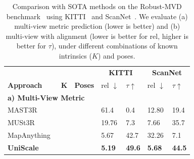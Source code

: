 \documentclass[letterpaper, 10 pt, conference]{ieeeconf}  %
\newcommand{\xmark}{\ding{55}}
\begin{document}
\begin{table} [t]
\vspace{2mm}
  \centering
  \scriptsize
  \caption{Comparison with SOTA methods on the Robust-MVD benchmark~\cite{schroppel2022benchmark} using KITTI~\cite{geiger2013vision} and ScanNet~\cite{dai2017scannet}. We evaluate (a) multi-view metric prediction (lower is better) and (b) multi-view with alignment (lower is better for rel, higher is better for $\tau$), under different combinations of known intrinsics ($K$) and poses.} \vspace{-2mm}
\begin{tabular}{p{2.4cm}p{0.3cm}p{0.3cm}p{0.5cm}p{0.5cm}p{0.5cm}p{0.5cm}}
 \hline
  &  &   & \multicolumn{2}{c}{\textbf{KITTI}} & \multicolumn{2}{c}{\textbf{ScanNet}}\\
\textbf{Approach}  & \textbf{K} & \textbf{Poses}  & {rel $\downarrow$} & {$\tau\uparrow$} & {rel $\downarrow$} & {$\tau\uparrow$} \\
\hline 

\multicolumn{7}{l}{\textbf{a) Multi-View Metric}} \\
MAST3R~\cite{leroy2024grounding}  & \xmark & \xmark &  61.4 & 0.4 & 12.80 & 19.4 \\
MUSt3R~\cite{cabon2025must3r}  & \xmark & \xmark &  19.76 & 7.3 & 7.66 & 35.7 \\
MapAnything~\cite{keetha2025mapanything}  & \xmark &  \xmark & 5.67 & 42.7 & 32.26 & 7.1 \\
\textbf{UniScale} & \xmark & \xmark  & \textbf{5.19} & \textbf{49.6} & \textbf{5.68} & \textbf{44.5} \\


\end{tabular}
\end{table}
\end{document}
